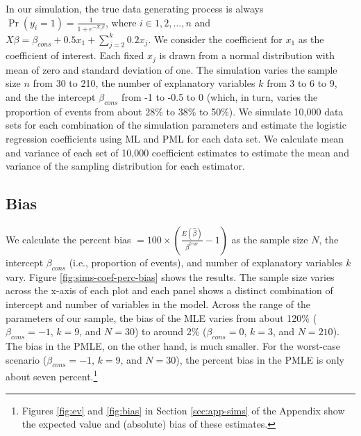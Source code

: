 \documentclass[12pt]{article}
\begin{document}
In our simulation, the true data generating process is always $\Pr(y_i = 1) = \frac{1}{1 + e^{-X_i \beta}}$, where $i \in 1, 2,..., n$ and $X \beta = \beta_{cons} + 0.5 x_1 + \sum_{j = 2}^k 0.2 x_j$. 
We consider the coefficient for $x_1$ as the coefficient of interest.
Each fixed $x_j$ is drawn from a normal distribution with mean of zero and standard deviation of one. 
The simulation varies the sample size $n$ from 30 to 210, the number of explanatory variables $k$ from 3 to 6 to 9, and the the intercept $\beta_{cons}$ from -1 to -0.5 to 0 (which, in turn, varies the proportion of events from about 28\% to 38\% to 50\%). 
We simulate 10,000 data sets for each combination of the simulation parameters and estimate the logistic regression coefficients using ML and PML for each data set.
We calculate mean and variance of each set of 10,000 coefficient estimates to estimate the mean and variance of the sampling distribution for each estimator. 

\subsection*{Bias}

We calculate the percent bias $= 100 \times \left(\frac{E(\hat{\beta})}{\beta^{true}} - 1 \right)$ as the sample size $N$, the intercept $\beta_{cons}$ (i.e., proportion of events), and number of explanatory variables $k$ vary.  
Figure \ref{fig:sims-coef-perc-bias} shows the results. 
The sample size varies across the x-axis of each plot and each panel shows a distinct combination of intercept and number of variables in the model. 
Across the range of the parameters of our sample, the bias of the MLE varies from about 120\% ($\beta_{cons} = -1$, $k = 9$, and $N = 30$) to around 2\% ($\beta_{cons} = 0$, $k = 3$, and $N = 210$). 
The bias in the PMLE, on the other hand, is much smaller. 
For the worst-case scenario ($\beta_{cons} = -1$, $k = 9$, and $N = 30$), the percent bias in the PMLE is only about seven percent.\footnote{Figures \ref{fig:ev} and \ref{fig:bias} in Section \ref{sec:app-sims} of the Appendix show the expected value and (absolute) bias of these estimates.}
\end{document}
